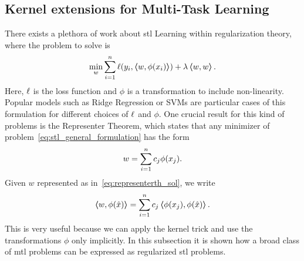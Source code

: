 \subsection{Kernel extensions for Multi-Task Learning} \label{subsec:kernels_mtl}
There exists a plethora of work about \acrshort{stl} Learning within regularization theory, where the problem to solve is
\begin{equation}
    \label{eq:stl_general_formulation}
    \begin{aligned}
        \min_{w} & \sum_{i=1}^{\nsamples} \lossf(y_i, \dotp{w}{\phi(x_i)}) + \lambda \dotp{w}{w} . \\
    \end{aligned}
\end{equation}
Here, $\ell$ is the loss function and $\phi$ is a transformation to include non-linearity. Popular models such as Ridge Regression or SVMs are particular cases of this formulation for different choices of $\ell$ and $\phi$.
One crucial result for this kind of problems is the {Representer Theorem}, which states that any minimizer of problem~\eqref{eq:stl_general_formulation} has the form
\begin{equation}
    \label{eq:representerth_sol}
    w = \sum_{i=1}^\nsamples c_j \phi(x_j) .
\end{equation}
Given $w$ represented as in~\eqref{eq:representerth_sol}, we write
\begin{equation}
    \nonumber
    \bm{\left\langle} w, \phi(\hat{x}) \bm{\right\rangle} = \sum_{i=1}^n c_j \bm{\left\langle} \phi(x_j), \phi(\hat{x}) \bm{\right\rangle}.
\end{equation}
This is very useful because we can apply the kernel trick and use the transformations $\phi$ only implicitly.
In this subsection it is shown how a broad class of \acrshort{mtl} problems can be expressed as regularized \acrfull{stl} problems.


